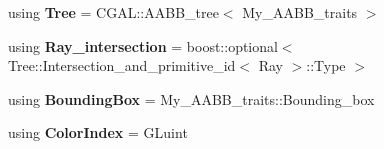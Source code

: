 \begin{DoxyCompactItemize}
\item 
\mbox{\label{classpepr3d_1_1_geometry_aa14c4ca4e78b66267ff0191397768159}} 
using {\bfseries Tree} = C\+G\+A\+L\+::\+A\+A\+B\+B\+\_\+tree$<$ My\+\_\+\+A\+A\+B\+B\+\_\+traits $>$
\item 
\mbox{\label{classpepr3d_1_1_geometry_a6ec337c2f2b15ab3cc65fbef4869a163}} 
using {\bfseries Ray\+\_\+intersection} = boost\+::optional$<$ Tree\+::\+Intersection\+\_\+and\+\_\+primitive\+\_\+id$<$ Ray $>$\+::Type $>$
\item 
\mbox{\label{classpepr3d_1_1_geometry_a817ca5983c6140981a78819b090bb899}} 
using {\bfseries Bounding\+Box} = My\+\_\+\+A\+A\+B\+B\+\_\+traits\+::\+Bounding\+\_\+box
\item 
\mbox{\label{classpepr3d_1_1_geometry_af654ca82ebbd5dd354a71af346937c32}} 
using {\bfseries Color\+Index} = G\+Luint
\end{DoxyCompactItemize}
